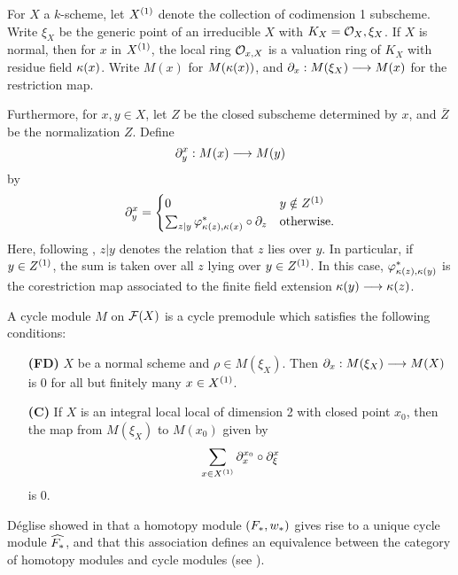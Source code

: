 For $X$ a $k$-scheme, let $\subsch{1}{X}$ denote the collection of 
codimension 1 subscheme. Write $\xi_X$ be the generic point of an
irreducible $X$ with $K_X = \O_X,\xi_X$. If $X$ is normal, then 
for $x$ in $\subsch{1}{X}$, the local ring $\O_{x,X}$ is a valuation 
ring of $K_X$ with residue field $\resf{x}$. Write $M(x)$ for 
$M(\resf{x})$, and $\res{x}: M(\xi_X) \to M(x)$ for the 
restriction map.

Furthermore, for $x, y \in X$, let $Z$ be the closed subscheme 
determined by $x$, and $\overline{Z}$ be the normalization $Z$.
Define
\[
\ptres{x}{y}: M(x) \to M(y)
\]
by
\[
\ptres{x}{y} = 
\begin{cases}
0 & y \notin \subsch{1}{Z} \\
\sum_{z|y} \phi_{\resf{z},\resf{x}}^* \comp \res{z} & \textrm{otherwise}.
\end{cases}
\]
Here, following \cite{Rost96}, $z|y$ denotes the relation that $z$ 
lies over $y$. In particular, if $y \in \subsch{1}{Z}$, the sum 
is taken over all $z$ lying over $y \in \subsch{1}{Z}$. In this
case, $\phi_{\resf{z},\resf{y}}^*$ is the corestriction map 
associated to the finite field extension $\resf{y} \to \resf{z}$.

\begin{defn}
A cycle module $M$ on $\fields(X)$ is a cycle premodule which
satisfies the following conditions:

\begin{enumerate}
\item[\textbf{(FD)}]  
$X$ be a normal scheme and $\rho \in M(\xi_X)$. Then $\res{x}: 
M(\xi_X) \to M(X)$ is 0 for all but finitely many $x \in 
\subsch{1}{X}$.

\item[\textbf{(C)}]  If $X$ is an integral
local local of dimension 2 with closed point $x_0$, then the map 
from $M(\xi_X)$ to $M(x_0)$ given by
\[
\sum_{x \in \subsch{1}{X}} \ptres{x_0}{x} \comp \ptres{x}{\xi}
\]
is 0.
\end{enumerate}
\end{defn}

D\'eglise showed in \cite{DegModHom} that a homotopy module $(F_*, 
\deloop_*)$ gives rise to a unique cycle module $\assocCM{F_*}$,
and that this association defines an equivalence between the 
category of homotopy modules and cycle modules (see 
\cite[3.7]{DegModHom}).


